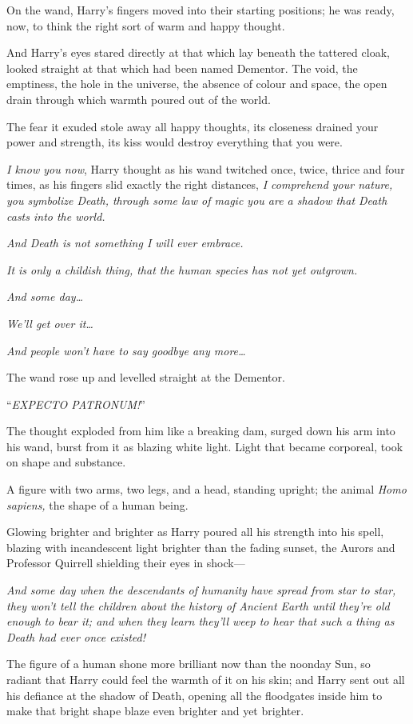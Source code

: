On the wand, Harry’s fingers moved into their starting positions; he was ready, now, to think the right sort of warm and happy thought.

And Harry’s eyes stared directly at that which lay beneath the tattered cloak, looked straight at that which had been named Dementor. The void, the emptiness, the hole in the universe, the absence of colour and space, the open drain through which warmth poured out of the world.

The fear it exuded stole away all happy thoughts, its closeness drained your power and strength, its kiss would destroy everything that you were.

\emph{I know you now}, Harry thought as his wand twitched once, twice, thrice and four times, as his fingers slid exactly the right distances, \emph{I comprehend your nature, you symbolize Death, through some law of magic you are a shadow that Death casts into the world.}

\emph{And Death is not something I will ever embrace.}

\emph{It is only a childish thing, that the human species has not yet outgrown.}

\emph{And some day…}

\emph{We’ll get over it…}

\emph{And people won’t have to say goodbye any more…}

The wand rose up and levelled straight at the Dementor.

“\emph{EXPECTO PATRONUM!}”

The thought exploded from him like a breaking dam, surged down his arm into his wand, burst from it as blazing white light. Light that became corporeal, took on shape and substance.

A figure with two arms, two legs, and a head, standing upright; the animal \emph{Homo sapiens,} the shape of a human being.

Glowing brighter and brighter as Harry poured all his strength into his spell, blazing with incandescent light brighter than the fading sunset, the Aurors and Professor Quirrell shielding their eyes in shock—

\emph{And some day when the descendants of humanity have spread from star to star, they won’t tell the children about the history of Ancient Earth until they’re old enough to bear it; and when they learn they’ll weep to hear that such a thing as Death had ever once existed!}

The figure of a human shone more brilliant now than the noonday Sun, so radiant that Harry could feel the warmth of it on his skin; and Harry sent out all his defiance at the shadow of Death, opening all the floodgates inside him to make that bright shape blaze even brighter and yet brighter.

